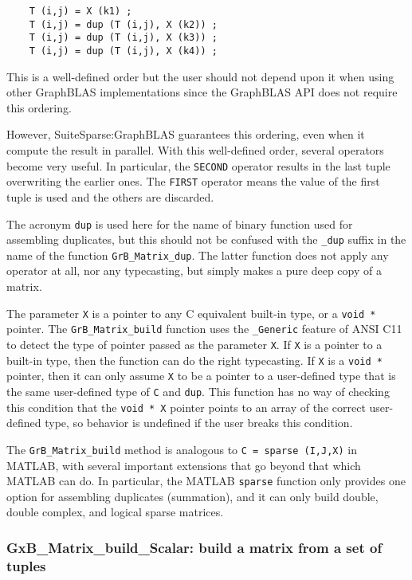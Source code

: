 \documentclass[12pt]{article}
\begin{document}
{    {\footnotesize
    \begin{verbatim}
    T (i,j) = X (k1) ;
    T (i,j) = dup (T (i,j), X (k2)) ;
    T (i,j) = dup (T (i,j), X (k3)) ;
    T (i,j) = dup (T (i,j), X (k4)) ; \end{verbatim}}

This is a well-defined order but the user should not depend upon it when using
other GraphBLAS implementations since the GraphBLAS API does not
require this ordering.

However, SuiteSparse:GraphBLAS guarantees this ordering, even when it compute
the result in parallel.  With this well-defined order, several operators become
very useful.  In particular, the \verb'SECOND' operator results in the last
tuple overwriting the earlier ones.  The \verb'FIRST' operator means the value
of the first tuple is used and the others are discarded.

The acronym \verb'dup' is used here for the name of binary function used for
assembling duplicates, but this should not be confused with the \verb'_dup'
suffix in the name of the function \verb'GrB_Matrix_dup'.  The latter function
does not apply any operator at all, nor any typecasting, but simply makes a
pure deep copy of a matrix.

The parameter \verb'X' is a pointer to any C equivalent built-in type, or a
\verb'void *' pointer.  The \verb'GrB_Matrix_build' function uses the
\verb'_Generic' feature of ANSI C11 to detect the type of pointer passed as the
parameter \verb'X'.  If \verb'X' is a pointer to a built-in type, then the
function can do the right typecasting.  If \verb'X' is a \verb'void *' pointer,
then it can only assume \verb'X' to be a pointer to a user-defined type that is
the same user-defined type of \verb'C' and \verb'dup'.  This function has no
way of checking this condition that the \verb'void * X' pointer points to an
array of the correct user-defined type, so behavior is undefined if the user
breaks this condition.

The \verb'GrB_Matrix_build' method is analogous to \verb'C = sparse (I,J,X)' in
MATLAB, with several important extensions that go beyond that which MATLAB can
do.  In particular, the MATLAB \verb'sparse' function only provides one option
for assembling duplicates (summation), and it can only build double, double
complex, and logical sparse matrices.

\newpage
\subsubsection{{\sf GxB\_Matrix\_build\_Scalar:} build a matrix from a set of tuples}
\label{matrix_build_Scalar}

}
\end{document}
